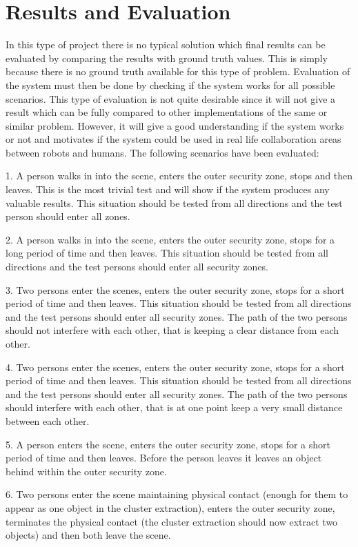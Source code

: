 \section{Results and Evaluation}
In this type of project there is no typical solution which final results can be evaluated by comparing the results with ground truth values. This is simply because there is no ground truth available for this type of problem. Evaluation of the system must then be done by checking if the system works for all possible scenarios. This type of evaluation is not quite desirable since it will not give a result which can be fully compared to other implementations of the same or similar problem. However, it will give a good understanding if the system works or not and motivates if the system could be used in real life collaboration areas between robots and humans. The following scenarios have been evaluated:

1. A person walks in into the scene, enters the outer security zone, stops and then leaves. This is the most trivial test and will show if the system produces any valuable results. This situation should be tested from all directions and the test person should enter all zones. 

2.  A person walks in into the scene, enters the outer security zone, stops for a long period of time and then leaves. This situation should be tested from all directions and the test persons should enter all security zones.

3. Two persons enter the scenes, enters the outer security zone, stops for a short period of time and then leaves. This situation should be tested from all directions and the test persons should enter all security zones. The path of the two persons should not interfere with each other, that is keeping a clear distance from each other. 

4. Two persons enter the scenes, enters the outer security zone, stops for a short period of time and then leaves. This situation should be tested from all directions and the test persons should enter all security zones. The path of the two persons should interfere with each other, that is at one point keep a very small distance between each other. 

5. A person enters the scene, enters the outer security zone, stops for a short period of time and then leaves. Before the person leaves it leaves an object behind within the outer security zone. 

6. Two persons enter the scene maintaining physical contact (enough for them to appear as one object in the cluster extraction), enters the outer security zone, terminates the physical contact (the cluster extraction should now extract two objects) and then both leave the scene.

